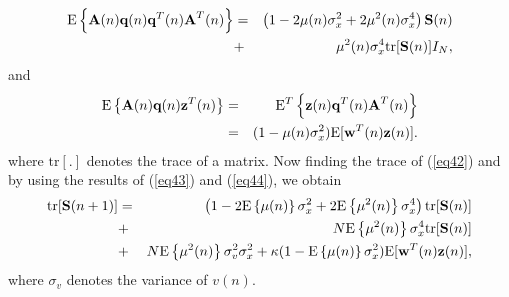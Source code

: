 \vspace{-1cm}
\begin{eqnarray}
\nonumber
\mathrm{E}\left\{\textbf{A}(n)\textbf{q}(n)\textbf{q}^{T}(n)\textbf{A}^{T}(n)\right\}&=&\left(1-2\mu(n)\sigma_{x}^{2} +2\mu^{2}(n)\sigma_{x}^{4}\right)\textbf{S}(n)\\
&+&\mu^{2}(n)\sigma_{x}^{4}\mathrm{tr}[\textbf{S}(n)]I_{N},\label{eq43}\vspace{-0.1cm}
\end{eqnarray}
\noindent and
\vspace{-0.1cm}
\begin{eqnarray}
\nonumber
\mathrm{E}\left\{\textbf{A}(n)\textbf{q}(n)\textbf{z}^{T}(n)\right\}&=&\mathrm{E}^{T}\left\{\textbf{z}(n)\textbf{q}^{T}(n)\textbf{A}^{T}(n)\right\}\\
&=&(1-\mu(n)\sigma_{x}^{2})\mathrm{E}[\textbf{w}^{T}(n)\textbf{z}(n)].\label{eq44}\vspace{-0.1cm}
\end{eqnarray}
\noindent  where $\mathrm{tr}[.]$ denotes the trace of a matrix. Now finding the trace of (\ref{eq42}) and by using the results of (\ref{eq43}) and (\ref{eq44}), we obtain
\vspace{-0.1cm}
\begin{eqnarray}
\nonumber
\mathrm{tr}[\textbf{S}(n+1)]&=&\left(1-2\mathrm{E}\left\{\mu(n)\right\}\sigma_{x}^{2}+2\mathrm{E}\left\{\mu^{2}(n)\right\}\sigma_{x}^{4}\right)
\mathrm{tr}[\textbf{S}(n)]\\
&+&N\mathrm{E}\left\{\mu^{2}(n)\right\}\sigma_{x}^{4}\mathrm{tr}[\textbf{S}(n)]\\
&+&N\mathrm{E}\left\{\mu^{2}(n)\right\}\sigma_{v}^{2}\sigma_{x}^{2}+\kappa(1-\mathrm{E}\left\{\mu(n)\right\}\sigma_{x}^{2})\mathrm{E}[\textbf{w}^T(n)\textbf{z}(n)],\label{eq45}\vspace{-0.1cm}
\end{eqnarray}
\noindent where $\sigma_{v}$ denotes the variance of $v(n)$.

